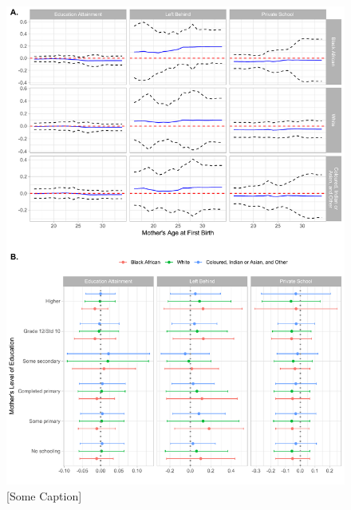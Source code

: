 \documentclass[11pt,a4paper]{article}
\begin{document}
\begin{figure}[h!]
\centering
\caption{\label{fig:06}[Some Caption]}
\includegraphics[width=\textwidth]{figures/heter2.pdf}
\end{figure}




 

\end{document}
